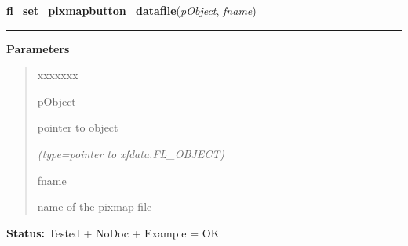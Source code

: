 \hspace{.8\funcindent}\begin{boxedminipage}{\funcwidth}

    \raggedright \textbf{fl\_set\_pixmapbutton\_datafile}(\textit{pObject}, \textit{fname})

    \vspace{-1.5ex}

    \rule{\textwidth}{0.5\fboxrule}
\setlength{\parskip}{2ex}
\setlength{\parskip}{1ex}
      \textbf{Parameters}
      \vspace{-1ex}

      \begin{quote}
        \begin{Ventry}{xxxxxxx}

          \item[pObject]

          pointer to object

            {\it (type=pointer to xfdata.FL\_OBJECT)}

          \item[fname]

          name of the pixmap file

        \end{Ventry}

      \end{quote}

\textbf{Status:} Tested + NoDoc + Example = OK



    \end{boxedminipage}

    \label{xformslib:library:fl_set_pixmap_align}

    \vspace{0.5ex}


